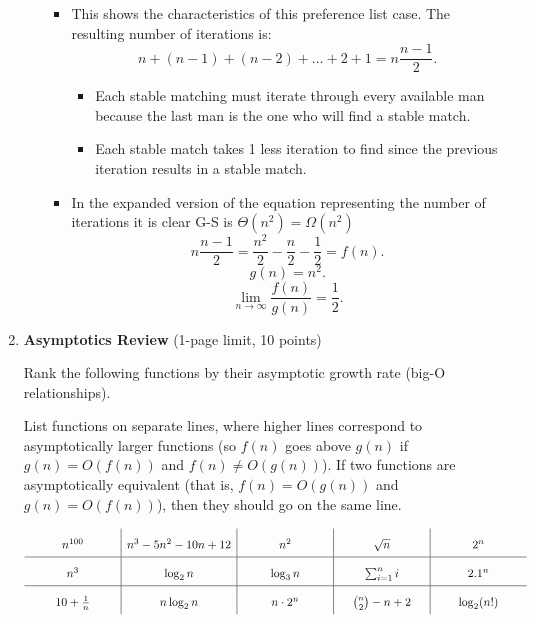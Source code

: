\documentclass[11pt]{article}
\begin{document}
\begin{enumerate}
\begin{enumerate}
\begin{itemize}
        \item This shows the characteristics of this preference list case. The resulting number of iterations is: \[
                n + (n-1) + (n-2) + \ldots + 2 + 1 = n\frac{n-1}{2}
        .\] 
        \begin{itemize}
            \item Each stable matching must iterate through every available man because the last man is the one who will find a stable match. 
            \item Each stable match takes 1 less iteration to find since the previous iteration results in a stable match.
        \end{itemize}
    \item In the expanded version of the equation representing the number of iterations it is clear G-S is $\Theta\left( n^2 \right) = \Omega\left( n^2 \right) $\[
            n\frac{n-1}{2} = \frac{n^2}{2}-\frac{n}{2}-\frac{1}{2} = f\left( n \right) 
    .\] \[
            g\left( n \right) = n^2
    .\] \[
    \lim_{n \to \infty} \frac{f\left( n \right) }{g\left( n \right) }= \frac{1}{2}
    .\]
    \end{itemize}
    \color{black}

\end{enumerate}


\newpage
\item {\bf Asymptotics Review} (1-page limit, 10 points)

Rank the following functions by their asymptotic growth rate (big-O relationships). 

List functions on separate lines, where higher lines correspond to asymptotically larger functions (so $f(n)$ goes above $g(n)$ if $g(n)=O(f(n))$ and $f(n)\neq O(g(n))$). If two functions are asymptotically equivalent (that is, $f(n)=O(g(n))$ and $g(n)=O(f(n))$), then they should go on the same line.


\[
\renewcommand{\arraystretch}{2}
\begin{array}{c|c|c|c|c}
 \makebox[1in]{\ensuremath{n^{100}}}& 
 n^3 - 5n^2 -10 n + 12 & 
  \makebox[1in]{\ensuremath{n^{2} }}& 
  \makebox[1in]{\ensuremath{\sqrt{n} }} & 
  \makebox[1in]{\ensuremath{2^n }}
\\ \hline 
n^3 & \log_2 n & \log_3 n  & \sum_{i=1}^n i & 2.1^n\\ \hline 
10 +\frac{1}{n} & n\log_2{n} & n\cdot 2^n & \binom{n}{2} - n + 2 &\log_2(n!)\\
\end{array}
\renewcommand{\arraystretch}{1}
\]



\end{enumerate}
\end{document}
